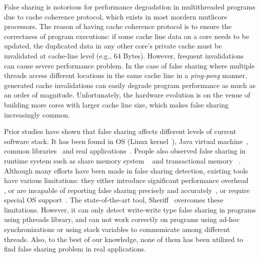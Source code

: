 
\label{sec:intro} 
False sharing is notorious for performance degradation in multithreaded
programs due to cache coherence protocol, which exists in most mordern 
 mutlicore processors.
The reason of having cache coherence protocol is to ensure the correctness of
program executions: 
if some cache line data on a core needs to be updated, the duplicated data in any other core's private 
cache must be invalidated at cache-line level (e.g., 64 Bytes). 
However, frequent invalidations can cause severe performance problem.
In the case of false sharing where multiple threads access different locations
in the same cache line in a \textit{ping-pong} manner, generated cache
invalidations can easily degrade program performance as much as an order of magnitude. 
Unfortunately, the hardware evolution is on the venue of building more cores
with larger cache line size, which makes false sharing increasingly common.

Prior studies have shown that false sharing affects different levels of current software stack.
It has been found in OS (Linux kernel~\cite{OSfalsesharing}), Java virtual machine~\cite{JVMfalsesharing}, 
common libraries~\cite{libfalsesharing} and real applications~\cite{appfalsesharing, mysql}. 
People also observed false sharing in runtime system such as share memory system
~\cite{dsmfalsesharing} and transactional memory ~\cite{tmfalsesharing}.
Although many efforts have been made in false sharing detection, existing
tools have various limitations:
they either introduce significant performance overhead~
\cite{falseshare:simulator, falseshare:binaryinstrumentation1,falseshare:binaryinstrumentation2}, or 
 are incapable of reporting false sharing 
precisely and accurately~\cite{qinzhaodetection, detect:ptu, detect:intel, falseshare:binaryinstrumentation1, DProf, falseshare:binaryinstrumentation2}, 
or require special OS support~\cite{OSdetection}.
The state-of-the-art tool, Sheriff~\cite{sheriff} overcomes these limitations. However, 
it can only detect write-write type false sharing in programs using pthreads library,
and can not work correctly on programs using ad-hoc synchronizations or using stack variables to 
communicate among different threads. Also, to the best of our knowledge, none of them has been 
utilized to find false sharing problem in real applications.

